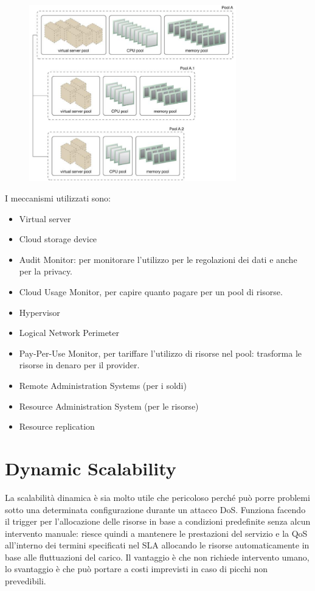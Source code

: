 \begin{figure}[htb!]
    \centering
    \includegraphics[width=9cm]{./Images/cap11/11.2.png}
\end{figure}

I meccanismi utilizzati sono:
\begin{itemize}
    \item Virtual server
    \item Cloud storage device
    \item Audit Monitor: per monitorare l'utilizzo per le regolazioni dei dati e anche per la privacy.
    \item Cloud Usage Monitor, per capire quanto pagare per un pool di risorse.
    \item Hypervisor
    \item Logical Network Perimeter
    \item Pay-Per-Use Monitor, per tariffare l'utilizzo di risorse nel pool: trasforma le risorse in denaro per il provider.
    \item Remote Administration Systems (per i soldi)
    \item Resource Administration System (per le risorse)
    \item Resource replication
\end{itemize}

\section{Dynamic Scalability}
La scalabilità dinamica è sia molto utile che pericoloso perché può porre problemi sotto una determinata configurazione durante un attacco DoS. Funziona facendo il trigger per l'allocazione delle risorse in base a condizioni predefinite senza alcun intervento manuale: riesce quindi a mantenere le prestazioni del servizio e la QoS all'interno dei termini specificati nel SLA allocando le risorse automaticamente in base alle fluttuazioni del carico. Il vantaggio è che non richiede intervento umano, lo svantaggio è che può portare a costi imprevisti in caso di picchi non prevedibili.

